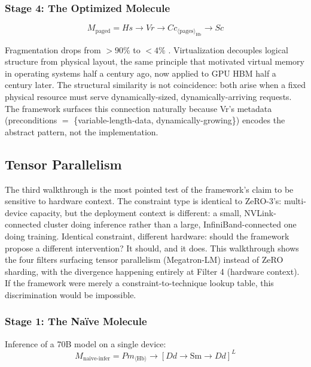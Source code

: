 \documentclass[10pt,twocolumn]{article}
\begin{document}
\subsubsection{Stage 4: The Optimized Molecule}

\begin{equation*}
M_{\text{paged}} = Hs \rightarrow Vr \rightarrow Cc_{\langle \text{pages} \rangle_{\text{Hb}}} \rightarrow Sc
\end{equation*}

Fragmentation drops from $>90\%$ to $<4\%$ \citep{kwon2023}. Virtualization decouples logical structure from physical layout, the same principle that motivated virtual memory in operating systems half a century ago, now applied to GPU HBM half a century later. The structural similarity is not coincidence: both arise when a fixed physical resource must serve dynamically-sized, dynamically-arriving requests. The framework surfaces this connection naturally because Vr's metadata (preconditions $=$ \{variable-length-data, dynamically-growing\}) encodes the abstract pattern, not the implementation.

\subsection{Tensor Parallelism}
\label{sec:tensor-parallel}

The third walkthrough is the most pointed test of the framework's claim to be sensitive to hardware context. The constraint type is identical to ZeRO-3's: multi-device capacity, but the deployment context is different: a small, NVLink-connected cluster doing inference rather than a large, InfiniBand-connected one doing training. Identical constraint, different hardware: should the framework propose a different intervention? It should, and it does. This walkthrough shows the four filters surfacing tensor parallelism (Megatron-LM) instead of ZeRO sharding, with the divergence happening entirely at Filter 4 (hardware context). If the framework were merely a constraint-to-technique lookup table, this discrimination would be impossible.

\subsubsection{Stage 1: The Na\"ive Molecule}

Inference of a 70B model on a single device:
\begin{equation*}
M_{\text{naive-infer}} = Pm_{\langle \text{Hb} \rangle} \rightarrow [Dd \rightarrow \text{Sm} \rightarrow Dd]^{L}
\end{equation*}
\end{document}

